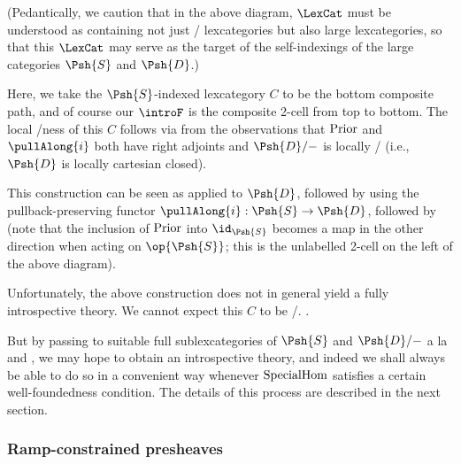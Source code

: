 \begin{construction}
(Pedantically, we caution that in the above diagram, $\LexCat$ must be understood as containing not just \setsmall/ lexcategories but also large lexcategories, so that this $\LexCat$ may serve as the target of the self-indexings of the large categories $\Psh{S}$ and $\Psh{D}$.)

Here, we take the $\Psh{S}$-indexed lexcategory $C$ to be the bottom composite path, and of course our $\introF$ is the composite 2-cell from top to bottom. The local \repsmall/ness of this $C$ follows via  from the observations that $\mathrm{Prior}$ and $\pullAlong{i}$ both have right adjoints and $\Psh{D}/-$ is locally \repsmall/ (i.e., $\Psh{D}$ is locally cartesian closed).

This construction can be seen as  applied to $\Psh{D}$, followed by  using the pullback-preserving functor $\pullAlong{i} : \Psh{S} \to \Psh{D}$, followed by  (note that the inclusion of $\mathrm{Prior}$ into $\id_{\Psh{S}}$ becomes a map in the other direction when acting on $\op{\Psh{S}}$; this is the unlabelled 2-cell on the left of the above diagram).
\end{construction}


Unfortunately, the above construction does not in general yield a fully introspective theory. We cannot expect this $C$ to be \repsmall/. .

But by passing to suitable full sublexcategories of $\Psh{S}$ and $\Psh{D}/-$ a la  and , we may hope to obtain an introspective theory, and indeed we shall always be able to do so in a convenient way whenever $\mathrm{SpecialHom}$ satisfies a certain well-foundedness condition. The details of this process are described in the next section.

\subsubsection{Ramp-constrained presheaves}
\TODO

\newcommand{\KFiberPsh}[2]{\Psh{#2}/_{#1}-}


